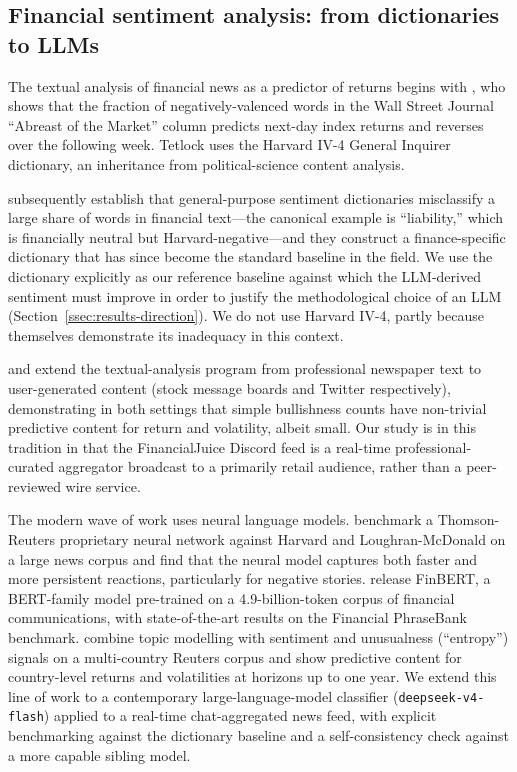 \subsection{Financial sentiment analysis: from dictionaries to LLMs}
\label{ssec:lit-sentiment}

The textual analysis of financial news as a predictor of returns
begins with \citet{tetlock2007giving}, who shows that the fraction of
negatively-valenced words in the Wall Street Journal ``Abreast of the
Market'' column predicts next-day index returns and reverses over the
following week. Tetlock uses the Harvard IV-4 General Inquirer
dictionary, an inheritance from political-science content analysis.

\citet{loughran2011liability} subsequently establish that
general-purpose sentiment dictionaries misclassify a large share of
words in financial text---the canonical example is ``liability,''
which is financially neutral but Harvard-negative---and they
construct a finance-specific dictionary that has since become the
standard baseline in the field. We use the
\citet{loughran2011liability} dictionary explicitly as our reference
baseline against which the LLM-derived sentiment must improve in
order to justify the methodological choice of an LLM
(Section~\ref{ssec:results-direction}). We do not use Harvard IV-4,
partly because \citet{loughran2011liability} themselves demonstrate
its inadequacy in this context.

\citet{antweiler2004talk} and \citet{bollen2011twitter} extend the
textual-analysis program from professional newspaper text to
user-generated content (stock message boards and Twitter
respectively), demonstrating in both settings that simple bullishness
counts have non-trivial predictive content for return and volatility,
albeit small. Our study is in this tradition in that the
FinancialJuice Discord feed is a real-time professional-curated
aggregator broadcast to a primarily retail audience, rather than a
peer-reviewed wire service.

The modern wave of work uses neural language models.
\citet{heston2017news} benchmark a Thomson-Reuters proprietary
neural network against Harvard and Loughran-McDonald on a large news
corpus and find that the neural model captures both faster and more
persistent reactions, particularly for negative stories.
\citet{yang2020finbert} release FinBERT, a BERT-family model
pre-trained on a 4.9-billion-token corpus of financial communications,
with state-of-the-art results on the Financial PhraseBank benchmark.
\citet{calomiris2019news} combine topic modelling with sentiment and
unusualness (``entropy'') signals on a multi-country Reuters corpus
and show predictive content for country-level returns and
volatilities at horizons up to one year. We extend this line of work
to a contemporary large-language-model classifier
(\texttt{deepseek-v4-flash}) applied to a real-time chat-aggregated
news feed, with explicit benchmarking against the dictionary baseline
and a self-consistency check against a more capable sibling model.


